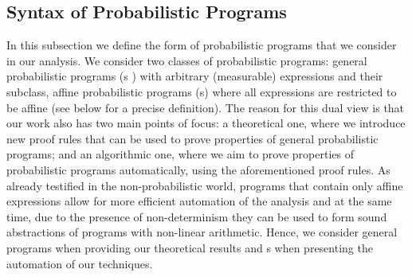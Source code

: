 

\vspace{-1em}
\subsection{Syntax of Probabilistic Programs}\label{subsec:syntax}
\vspace{-0.5em}

In this subsection we define the form of probabilistic programs that we 
consider in our analysis. We consider two classes of probabilistic programs: 
general probabilistic programs (\PP{}s ) with arbitrary (measurable) 
expressions and 
their subclass, affine probabilistic programs (\APP s) where all expressions 
are restricted to be affine (see below for a precise definition). The reason 
for this dual view is that our work also has two main points of focus: a 
theoretical one, where we introduce new proof rules that can be used to prove 
properties of general probabilistic programs; and an algorithmic one, where we 
aim to prove properties of probabilistic programs automatically, using the 
aforementioned proof rules. As already testified in the non-probabilistic 
world, programs that contain only affine expressions allow for more efficient 
automation of the analysis and at the same time, due to the presence of 
non-determinism they can be used to form sound abstractions of programs with 
non-linear arithmetic. Hence, we consider general programs when providing our 
theoretical results and \APP s when presenting the automation of our techniques.

